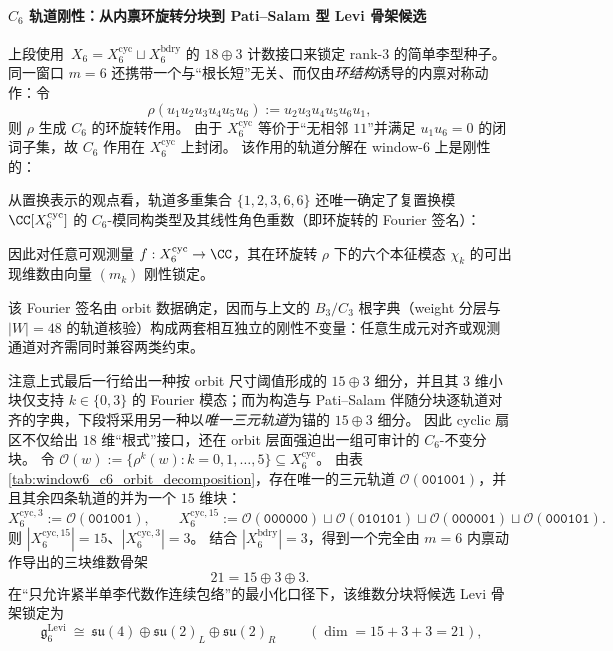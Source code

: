 \paragraph{\texorpdfstring{$C_6$}{C6} 轨道刚性：从内禀环旋转分块到 Pati--Salam 型 Levi 骨架候选}
上段使用 \(\,X_6=X_6^{\mathrm{cyc}}\sqcup X_6^{\mathrm{bdry}}\) 的 \(18\oplus 3\) 计数接口来锁定 rank-\(3\) 的简单李型种子。
同一窗口 \(m=6\) 还携带一个与“根长短”无关、而仅由\emph{环结构}诱导的内禀对称动作：令
\[
\rho(u_1u_2u_3u_4u_5u_6):=u_2u_3u_4u_5u_6u_1,
\]
则 \(\rho\) 生成 \(C_6\) 的环旋转作用。
由于 \(X_6^{\mathrm{cyc}}\) 等价于“无相邻 \(11\)”并满足 \(u_1u_6=0\) 的闭词子集，故 \(C_6\) 作用在 \(X_6^{\mathrm{cyc}}\) 上封闭。
该作用的轨道分解在 window-6 上是刚性的：


从置换表示的观点看，轨道多重集合 \(\{1,2,3,6,6\}\) 还唯一确定了复置换模 \(\CC[X_6^{\mathrm{cyc}}]\) 的 \(C_6\)-模同构类型及其线性角色重数（即环旋转的 Fourier 签名）：

因此对任意可观测量 \(f:X_6^{\mathrm{cyc}}\to\CC\)，其在环旋转 \(\rho\) 下的六个本征模态 \(\chi_k\) 的可出现维数由向量 \((m_k)\) 刚性锁定。
\par
该 Fourier 签名由 orbit 数据确定，因而与上文的 \(B_3/C_3\) 根字典（weight 分层与 \(|W|=48\) 的轨道核验）构成两套相互独立的刚性不变量：任意生成元对齐或观测通道对齐需同时兼容两类约束。
\par
注意上式最后一行给出一种按 orbit 尺寸阈值形成的 \(15\oplus 3\) 细分，并且其 \(3\) 维小块仅支持 \(k\in\{0,3\}\) 的 Fourier 模态；而为构造与 Pati--Salam 伴随分块逐轨道对齐的字典，下段将采用另一种以\emph{唯一三元轨道}为锚的 \(15\oplus 3\) 细分。
因此 cyclic 扇区不仅给出 \(18\) 维“根式”接口，还在 orbit 层面强迫出一组可审计的 \(C_6\)-不变分块。
令 \(\mathcal{O}(w):=\{\rho^k(w):k=0,1,\dots,5\}\subseteq X_6^{\mathrm{cyc}}\)。
由表 \ref{tab:window6_c6_orbit_decomposition}，存在唯一的三元轨道 \(\mathcal{O}(\texttt{001001})\)，并且其余四条轨道的并为一个 \(15\) 维块：
\[
X^{\mathrm{cyc},3}_6:=\mathcal{O}(\texttt{001001}),\qquad
X^{\mathrm{cyc},15}_6:=\mathcal{O}(\texttt{000000})\sqcup \mathcal{O}(\texttt{010101})\sqcup \mathcal{O}(\texttt{000001})\sqcup \mathcal{O}(\texttt{000101}).
\]
则 \(|X^{\mathrm{cyc},15}_6|=15\)、\(|X^{\mathrm{cyc},3}_6|=3\)。
结合 \(|X_6^{\mathrm{bdry}}|=3\)，得到一个完全由 \(m=6\) 内禀动作导出的三块维数骨架
\[
21=15\oplus 3\oplus 3.
\]
在“只允许紧半单李代数作连续包络”的最小化口径下，该维数分块将候选 Levi 骨架锁定为
\[
\boxed{\;\mathfrak g_{6}^{\mathrm{Levi}}\ \cong\ \mathfrak{su}(4)\oplus\mathfrak{su}(2)_L\oplus\mathfrak{su}(2)_R\;}\qquad(\dim=15+3+3=21),
\]
